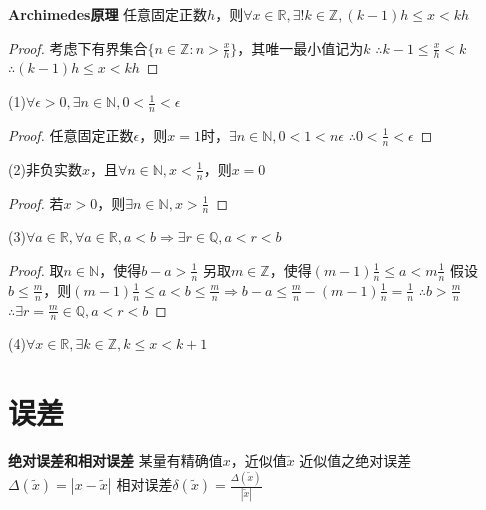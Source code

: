 \documentclass[11pt]{article}
\begin{document}
\textbf{Archimedes原理} \newline
任意固定正数$h$，则$\forall x\in\mathbb{R}, \exists! k\in\mathbb{Z}, (k-1)h\le x<kh$ \newline
\begin{proof}
  考虑下有界集合$\{n\in\mathbb{Z}:n>\frac{x}{h}\}$，其唯一最小值记为$k$\newline
  $\therefore k-1\le\frac{x}{h}<k$ \newline
  $\therefore (k-1)h\le x<kh$
\end{proof}

(1)$\forall\epsilon>0, \exists n\in\mathbb{N}, 0<\frac{1}{n}<\epsilon$ \newline
\begin{proof}
  任意固定正数$\epsilon$，则$x=1$时，$\exists n\in\mathbb{N}, 0<1<n \epsilon$ \newline
  $\therefore 0<\frac{1}{n}<\epsilon$
\end{proof}
(2)非负实数$x$，且$\forall n\in\mathbb{N}, x<\frac{1}{n}$，则$x=0$ \newline
\begin{proof}
  若$x>0$，则$\exists n\in\mathbb{N}, x>\frac{1}{n}$
\end{proof}
(3)$\forall a\in\mathbb{R}, \forall a\in\mathbb{R}, a<b \Rightarrow \exists r\in\mathbb{Q}, a<r<b$ \newline
\begin{proof}
  取$n\in\mathbb{N}$，使得$b-a>\frac{1}{n}$ \newline
  另取$m\in\mathbb{Z}$，使得$(m-1)\frac{1}{n} \le a<m\frac{1}{n}$ \newline
  假设$b\le \frac{m}{n}$，则$(m-1)\frac{1}{n}\le a<b \le\frac{m}{n}\Rightarrow b-a \le \frac{m}{n}-(m-1)\frac{1}{n}=\frac{1}{n}$ \newline
  $\therefore b>\frac{m}{n}$ \newline
  $\therefore \exists r=\frac{m}{n} \in\mathbb{Q},a<r<b$
\end{proof}
(4)$\forall x\in\mathbb{R}, \exists k\in\mathbb{Z}, k\le x<k+1$ \newline

\section{误差}
\textbf{绝对误差和相对误差}\newline
某量有精确值$x$，近似值$\tilde{x}$ \newline
近似值之绝对误差$\Delta(\tilde{x})=|x-\tilde{x}|$ \newline
相对误差$\delta(\tilde{x})=\frac{\Delta(\tilde{x})}{|\tilde{x}|}$ \newline
\end{document}
